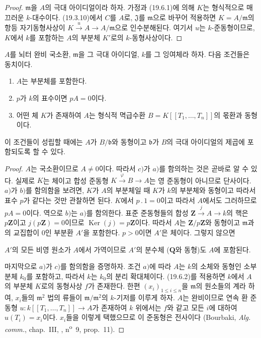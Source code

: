 \begin{proof}
$\mathfrak m$을 $A$의 극대 아이디얼이라 하자. 가정과 (19.6.1)에 의해
$K$는 형식적으로 매끄러운 $k$-대수이다. (19.3.10)에서 $C$를 $A$로,
$\mathfrak J$를 $\mathfrak m$으로 바꾸어 적용하면
$K=A/\mathfrak m$의 항등 자기동형사상이
$K\xrightarrow{u}A\to A/\mathfrak m$으로 인수분해된다. 여기서 $u$는
$k$-준동형이므로, $K$에서 $k$를 포함하는 $A$의 부분체 $K'$로의
$k$-동형사상이다.
\end{proof}

\begin{corollary}[19.6.3]
\label{0.19.6.3-ko}
$A$를 뇌터 완비 국소환, $\mathfrak m$을 그 극대 아이디얼, $k$를 그
잉여체라 하자. 다음 조건들은 동치이다.
\begin{enumerate}
  \item[a)] $A$는 부분체를 포함한다.
  \item[b)] $p$가 $k$의 표수이면 $pA=0$이다.
  \item[c)] 어떤 체 $K$가 존재하여 $A$는 형식적 멱급수환
  $B=K[[T_1,\ldots,T_n]]$의 몫환과 동형이다.
\end{enumerate}
이 조건들이 성립할 때에는 $A$가 $B/\mathfrak b$와 동형이고
$\mathfrak b$가 $B$의 극대 아이디얼의 제곱에 포함되도록 할 수 있다.
\end{corollary}

\begin{proof}
$A$는 국소환이므로 $A\neq0$이다. 따라서 $c)$가 $a)$를 함의하는 것은
곧바로 알 수 있다. 실제로 $K$는 체이고 합성 준동형
$K\xrightarrow{\varphi}B\to A$는 영 준동형이 아니므로 단사이다. $a)$가
$b)$를 함의함을 보려면, $K$가 $A$의 부분체일 때 $K$가 $k$의
부분체와 동형이고 따라서 표수 $p$가 같다는 것만 관찰하면 된다.
$K$에서 $p\mathbin{.}1=0$이고 따라서 $A$에서도 그러하므로 $pA=0$이다.
역으로 $b)$는 $a)$를 함의한다. 표준 준동형들의 합성
$\mathbf Z\xrightarrow{j}A\to k$의 핵은 $p\mathbf Z$이고
$j(p\mathbf Z)=0$이므로 $\operatorname{Ker}(j)=p\mathbf Z$이다. 따라서
$A$는 $\mathbf Z/p\mathbf Z$와 동형이고 $\mathfrak m$과의 교집합이
$0$인 부분환 $A'$을 포함한다. $p>0$이면 $A'$은 체이다. 그렇지 않으면


$A'$의 모든 비영 원소가 $A$에서 가역이므로 $A'$의 분수체
($\mathbf Q$와 동형)도 $A$에 포함된다.

마지막으로 $a)$가 $c)$를 함의함을 증명하자. 조건 $a)$에 따라 $A$는
$k$의 소체와 동형인 소부분체 $k_0$를 포함하고, 따라서 $k$는
$k_0$의 분리 확대체이다. (19.6.2)를 적용하면 $k$에서 $A$의 부분체
$K$로의 동형사상 $f$가 존재한다. 한편 $(x_i)_{1\leq i\leq n}$을
$\mathfrak m$의 원소들의 계라 하여, $x_i$들의 $\mathfrak m^2$ 법의
류들이 $\mathfrak m/\mathfrak m^2$의 $k$-기저를 이루게 하자. $A$는
완비이므로 연속 환 준동형
$u:k[[T_1,\ldots,T_n]]\to A$가 존재하여 $k$ 위에서는 $f$와 같고 모든
$i$에 대하여 $u(T_i)=x_i$이다. $x_i$들을 이렇게 택했으므로 이
준동형은 전사이다 (Bourbaki, \emph{Alg. comm.}, chap.~III,
, n\textsuperscript{o}~9, prop.~11).
\end{proof}


